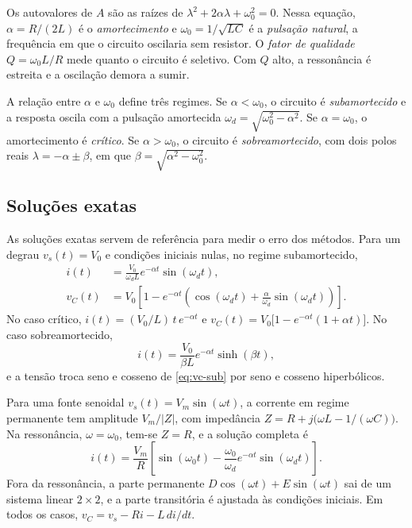 Os autovalores de \(A\) são as raízes de \(\lambda^{2}+2\alpha\lambda+\omega_0^{2}=0\). Nessa equação, \(\alpha=R/(2L)\) é o \emph{amortecimento} e \(\omega_0=1/\sqrt{LC}\) é a \emph{pulsação natural}, a frequência em que o circuito oscilaria sem resistor. O \emph{fator de qualidade} \(Q=\omega_0L/R\) mede quanto o circuito é seletivo. Com \(Q\) alto, a ressonância é estreita e a oscilação demora a sumir.

A relação entre \(\alpha\) e \(\omega_0\) define três regimes. Se \(\alpha<\omega_0\), o circuito é \emph{subamortecido} e a resposta oscila com a pulsação amortecida \(\omega_d=\sqrt{\omega_0^{2}-\alpha^{2}}\). Se \(\alpha=\omega_0\), o amortecimento é \emph{crítico}. Se \(\alpha>\omega_0\), o circuito é \emph{sobreamortecido}, com dois polos reais \(\lambda=-\alpha\pm\beta\), em que \(\beta=\sqrt{\alpha^{2}-\omega_0^{2}}\).

\subsection{Soluções exatas}

As soluções exatas servem de referência para medir o erro dos métodos. Para um degrau \(v_s(t)=V_0\) e condições iniciais nulas, no regime subamortecido,
\begin{align}
i(t)&=\frac{V_0}{\omega_d L}e^{-\alpha t}\sin(\omega_d t), \label{eq:i-sub}\\
v_C(t)&=V_0\left[1-e^{-\alpha t}\left(\cos(\omega_d t)+\frac{\alpha}{\omega_d}\sin(\omega_d t)\right)\right]. \label{eq:vc-sub}
\end{align}
No caso crítico, \(i(t)=(V_0/L)\,t\,e^{-\alpha t}\) e \(v_C(t)=V_0\bigl[1-e^{-\alpha t}(1+\alpha t)\bigr]\). No caso sobreamortecido,
\begin{equation}
i(t)=\frac{V_0}{\beta L}e^{-\alpha t}\sinh(\beta t),
\label{eq:i-sobre}
\end{equation}
e a tensão troca seno e cosseno de \eqref{eq:vc-sub} por seno e cosseno hiperbólicos.

Para uma fonte senoidal \(v_s(t)=V_m\sin(\omega t)\), a corrente em regime permanente tem amplitude \(V_m/|Z|\), com impedância \(Z=R+j\bigl(\omega L-1/(\omega C)\bigr)\). Na ressonância, \(\omega=\omega_0\), tem-se \(Z=R\), e a solução completa é
\begin{equation}
i(t)=\frac{V_m}{R}\left[\sin(\omega_0 t)-\frac{\omega_0}{\omega_d}e^{-\alpha t}\sin(\omega_d t)\right].
\label{eq:i-res}
\end{equation}
Fora da ressonância, a parte permanente \(D\cos(\omega t)+E\sin(\omega t)\) sai de um sistema linear \(2\times 2\), e a parte transitória é ajustada às condições iniciais. Em todos os casos, \(v_C=v_s-Ri-L\,di/dt\).

